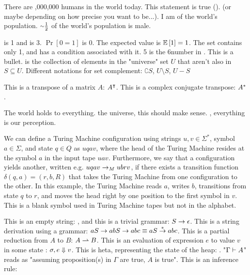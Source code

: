 \documentclass{article}
\begin{document}
\begin{solution}
    \par There are ,000,000 humans in the world today. This statement is true (\true). (or maybe \false depending on how precise you want to be...). I am  of the world's population. $\approx\half$ of the world's population is male.
    \par {} is 1 and  is 3. $\Pr{[0=1]}$ is 0. The expected value is $\operatorname*{\mathbb{E}}{[1]} = 1$. The set  contains only 1, and  has a condition associated with it. 5 is the 6\th number in \N. This \bigcdot is a bullet.  is the collection of elements in the "universe" set $U$ that aren't also in $S \subseteq U$. Different notations for set complement: $\complement{S}$, $U \setminus S$, $U - S$\\
    \par This is a transpose of a matrix $A$: ${A}^\intercal$. This is a complex conjugate transpose: ${A}^*$.
    \par The world holds \WLOG to everything. \Wrt the universe, this should make sense. \Wlog, everything is  \wrt our perception.

    \par We can define a Turing Machine configuration using strings $u,v \in \Sigma^*$, symbol $a \in \Sigma$, and state $q \in Q$ as $uqav$, where the head of the Turing Machine resides at the symbol $a$ in the input tape $uav$. Furthermore, we say that a configuration yields another, written e.g. $uqav \rightarrow_M ubrv$, if there exists a transition function $\delta(q, a) = (r, b, R)$ that takes the Turing Machine from one configuration to the other. In this example, the Turing Machine reads $a$, writes $b$, transitions from state $q$ to $r$, and moves the head right by one position to the first symbol in $v$. This \blanksymbol is a blank symbol used in Turing Machine tapes but not in the alphabet.
    \par This is an empty string: \emptystring, and this is a trivial grammar: $S \mathrel{\rightarrow} \epsilon$. This is a string derivation using a grammar: $aS \mathrel{\rightarrow} abS \mathrel{\rightarrow} abc \equiv aS \mathrel{\overset{*}{\rightarrow}} abc$. This is a partial reduction from $A$ to $B$: $A \rightharpoonup B$. This is an evaluation of expression $e$ to value $v$ in some state \state: $\sigma, e \mathrel{\Downarrow} v$. This is heta, representing the state of the heap: \heap. "$\Gamma \vdash A$" reads as "assuming proposition(s) in $\Gamma$ are true, $A$ is true".
    This is an inference rule:
    

\end{solution}
\end{document}
